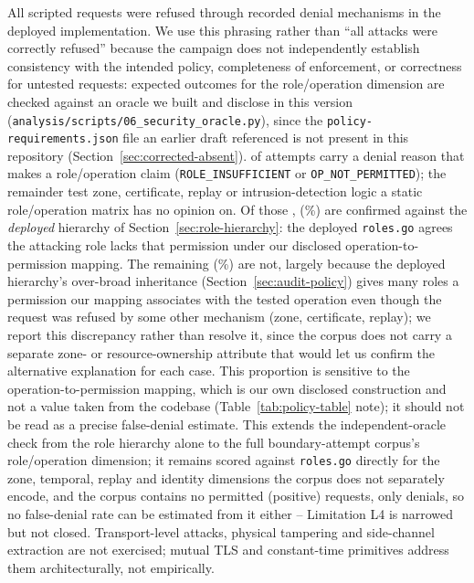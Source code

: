 All \SecurityAttemptsTotal{} scripted requests were refused through \SecurityDenialMechanisms{} recorded denial mechanisms in the deployed implementation. We use this phrasing rather than ``all attacks were correctly refused'' because the campaign does not independently establish consistency with the intended policy, completeness of enforcement, or correctness for untested requests: expected outcomes for the role/operation dimension are checked against an oracle we built and disclose in this version (\texttt{analysis/scripts/06\_security\_oracle.py}), since the \texttt{policy-requirements.json} file an earlier draft referenced is not present in this repository (Section~\ref{sec:corrected-absent}). \OracleScoredAttempts{} of \SecurityAttemptsTotal{} attempts carry a denial reason that makes a role/operation claim (\texttt{ROLE\_INSUFFICIENT} or \texttt{OP\_NOT\_PERMITTED}); the remainder test zone, certificate, replay or intrusion-detection logic a static role/operation matrix has no opinion on. Of those \OracleScoredAttempts, \OracleConfirmed{} (\OracleConfirmedPct\%) are confirmed against the \emph{deployed} hierarchy of Section~\ref{sec:role-hierarchy}: the deployed \texttt{roles.go} agrees the attacking role lacks that permission under our disclosed operation-to-permission mapping. The remaining \OracleDiscrepant{} (\OracleDiscrepantPct\%) are not, largely because the deployed hierarchy's over-broad inheritance (Section~\ref{sec:audit-policy}) gives many roles a permission our mapping associates with the tested operation even though the request was refused by some other mechanism (zone, certificate, replay); we report this discrepancy rather than resolve it, since the corpus does not carry a separate zone- or resource-ownership attribute that would let us confirm the alternative explanation for each case. This proportion is sensitive to the operation-to-permission mapping, which is our own disclosed construction and not a value taken from the codebase (Table~\ref{tab:policy-table} note); it should not be read as a precise false-denial estimate. This extends the independent-oracle check from the role hierarchy alone to the full boundary-attempt corpus's role/operation dimension; it remains scored against \texttt{roles.go} directly for the zone, temporal, replay and identity dimensions the corpus does not separately encode, and the corpus contains no permitted (positive) requests, only denials, so no false-denial rate can be estimated from it either -- Limitation L4 is narrowed but not closed. Transport-level attacks, physical tampering and side-channel extraction are not exercised; mutual TLS and constant-time primitives address them architecturally, not empirically.

